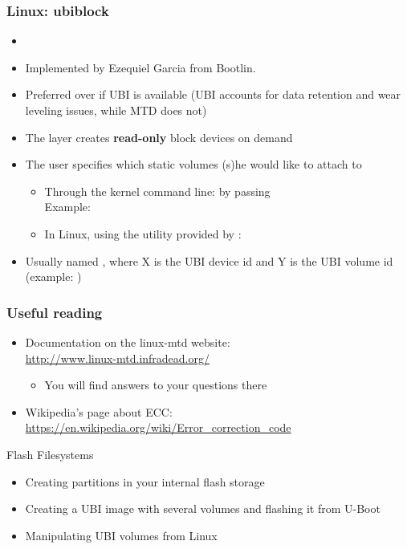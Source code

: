 \begin{frame}
  \frametitle{Linux: ubiblock}
  \begin{itemize}
  \item {}
  \item Implemented by Ezequiel Garcia from Bootlin.
  \item Preferred over  if UBI is available (UBI accounts
    for data retention and wear leveling issues, while MTD does not)
  \item The  layer creates {\bf read-only} block devices
    on demand
  \item The user specifies which static volumes (s)he would like to attach
    to 
    \begin{itemize}
    \item Through the kernel command line: by passing
      \\
      Example: \\
    \item In Linux, using the  utility provided by :
    \end{itemize}
   \item Usually named , where X is the UBI device
     id and Y is the UBI volume id (example: )
  \end{itemize}
\end{frame}

\begin{frame}
  \frametitle{Useful reading}
  \begin{itemize}
  \item Documentation on the linux-mtd website:\\
    \url{http://www.linux-mtd.infradead.org/}
    \begin{itemize}
	\item You will find answers to your questions there
    \end{itemize}
  \item Wikipedia's page about ECC:\\
    \url{https://en.wikipedia.org/wiki/Error_correction_code}
  \end{itemize}
\end{frame}

\setuplabframe
{Flash Filesystems}
{
  \begin{itemize}
  \item Creating partitions in your internal flash storage
  \item Creating a UBI image with several volumes and flashing it from
    U-Boot
  \item Manipulating UBI volumes from Linux
  \end{itemize}
}
